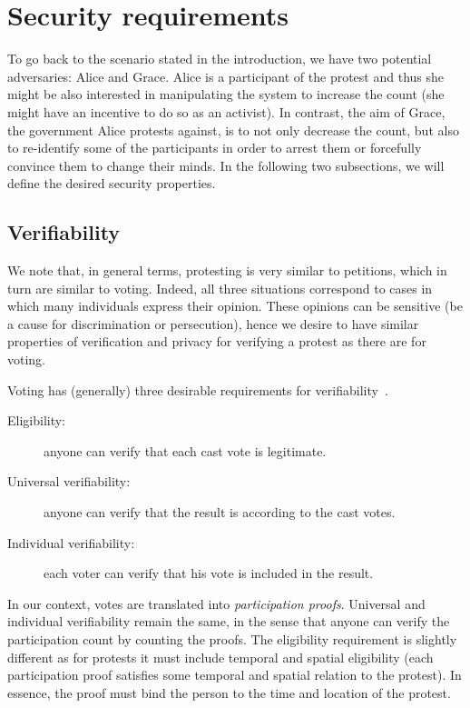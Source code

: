 \section{Security requirements}%
\label{Properties}


To go back to the scenario stated in the introduction, we have two potential adversaries: Alice and Grace.
Alice is a participant of the protest and thus she might be also interested in manipulating the system to increase the count (\eg she might have an incentive to do so as an activist).
In contrast, the aim of Grace, the government Alice protests against, is to not only decrease the count, but also to re-identify some of the participants in order to arrest them or forcefully convince them to change their minds.
In the following two subsections, we will define the desired security properties.

\subsection{Verifiability}%
\label{Verifiability}

We note that, in general terms, protesting is very similar to petitions, which in turn are similar to voting.
Indeed, all three situations correspond to cases in which many individuals express their opinion.
These opinions can be sensitive (\eg be a cause for discrimination or persecution), hence we desire to have similar properties of verification and privacy for verifying a protest as there are for voting.

Voting has (generally) three desirable requirements for verifiability~\cite{VerifyingPrivacyPropertiesOfVotingProtocols}.
\begin{description}
  \item[Eligibility:] anyone can verify that each cast vote is legitimate.
  \item[Universal verifiability:] anyone can verify that the result is according to the cast votes.
  \item[Individual verifiability:] each voter can verify that his vote is included in the result.
\end{description}
In our context, votes are translated into \emph{participation proofs}.
Universal and individual verifiability remain the same, in the sense that anyone can verify the participation count by counting the proofs.
The eligibility requirement is slightly different as for protests it must include temporal and spatial eligibility (\ie each participation proof satisfies some temporal and spatial relation to the protest).
In essence, the proof must bind the person to the time and location of the protest.

